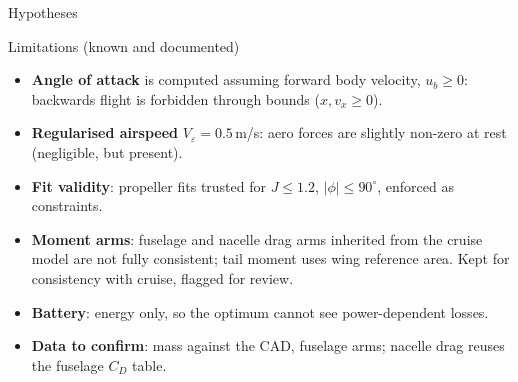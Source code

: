 \documentclass[11pt]{article}
\newcommand{\colpos}{t}
\newcommand{\colstart}{}
\newcommand{\column}[1]{\colsep
  \begin{minipage}[\colpos]{\dimexpr #1-3mm\relax}\colstart\def\colsep{\end{minipage}\hfill}}
\begin{document}
\begin{frame}{Hypotheses}
\end{frame}

\begin{frame}{Limitations (known and documented)}
  \begin{itemize}
    \item \textbf{Angle of attack} is computed assuming forward body velocity, $u_b \ge 0$:
          backwards flight is forbidden through bounds ($x, v_x \ge 0$).
    \item \textbf{Regularised airspeed} $V_\varepsilon = 0.5$\,m/s: aero forces are slightly non-zero at rest
          (negligible, but present).
    \item \textbf{Fit validity}: propeller fits trusted for $J \le 1.2$, $|\phi| \le 90^\circ$, enforced as constraints.
    \item \textbf{Moment arms}: fuselage and nacelle drag arms inherited from the cruise model are not fully
          consistent; tail moment uses wing reference area. Kept for consistency with cruise, flagged for review.
    \item \textbf{Battery}: energy only, so the optimum cannot see power-dependent losses.
    \item \textbf{Data to confirm}: mass against the CAD, fuselage arms; nacelle drag reuses the fuselage $C_D$ table.
  \end{itemize}
\end{frame}
\end{document}
